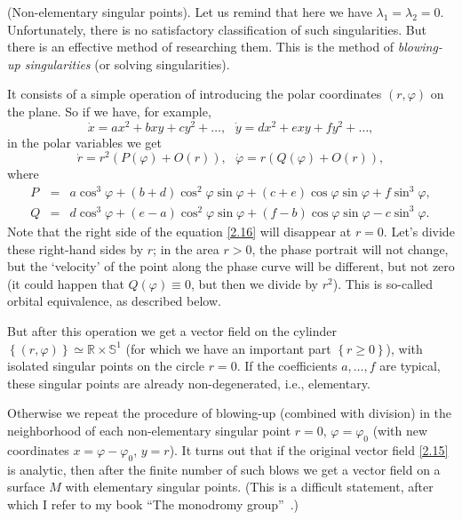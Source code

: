 \begin{remark}(Non-elementary singular points).
	Let us remind that here we have $\lambda _{1}=\lambda _{2}=0.$ Unfortunately, there is no satisfactory classification of such singularities. But there is an effective method of researching them. This is the method of \textit{blowing-up singularities} (or solving singularities).
	
	It consists of a simple operation of introducing the polar coordinates $ \left (r, \varphi \right) $ on the plane. So if we have, for example,
	\begin{equation}
	\label{2.15}
	\dot{x}=ax^{2}+bxy+cy^{2}+\ldots ,\text{ \ }\dot{y}=dx^{2}+exy+fy^{2}+\ldots
	,
	\end{equation}
	in the polar variables we get
	\begin{equation}
	\label{2.16}
	\dot{r}=r^{2}\left( P(\varphi )+O(r)\right) ,\text{ \ \ }\dot{\varphi}%
	=r\left( Q(\varphi )+O(r)\right) ,
	\end{equation}
	where
	\begin{eqnarray*}
		P &=&a\cos ^{3}\varphi +(b+d)\cos ^{2}\varphi \sin \varphi +(c+e)\cos
		\varphi \sin \varphi +f\sin ^{3}\varphi , \\
		Q &=&d\cos ^{3}\varphi +(e-a)\cos ^{2}\varphi \sin \varphi +(f-b)\cos
		\varphi \sin \varphi -c\sin ^{3}\varphi .
	\end{eqnarray*}
	Note that the right side of the equation \eqref{2.16} will disappear at $r = 0$. Let's divide these right-hand sides by $r$; in the area $r> 0$, the phase portrait will not change, but the `velocity' of the point along the phase curve will be different, but not zero (it could happen that $Q(\varphi )\equiv 0$, but then we divide by $r^2$). This is so-called orbital equivalence, as described below.
	
	But after this operation we get a vector field on the cylinder $\left\{ \left( r,\varphi \right) \right\} \simeq \mathbb{R}\times \mathbb{S}^{1}$ (for which we have an important part $\left\{ r\geq 0\right\} $), with isolated singular points on the circle $r = 0$. If the coefficients $a,\ldots ,f$ are typical, these singular points are already non-degenerated, i.e., elementary.
	
	Otherwise we repeat the procedure of blowing-up (combined with division) in the neighborhood of each non-elementary singular point $r = 0$, $\varphi =\varphi _{0}$ (with new coordinates $x=\varphi -\varphi _{0}$, $y=r$). It turns out that if the original vector field \eqref{2.15} is analytic, then after the finite number of such blows we get a vector field on a surface $M$ with elementary singular points. (This is a difficult statement, after which I refer to my book \textquotedblleft The monodromy group\textquotedblright\ \cite{Zol2}.)
\end{remark}

